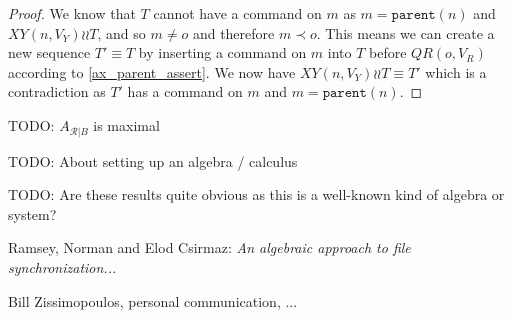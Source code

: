 \documentclass[12pt]{article}
\newcommand{\parent}{\mathtt{parent}}
\newcommand{\fscommand}[2]{{#1#2}}
\newcommand{\cxy}{\fscommand{X}{Y}}
\newcommand{\cqr}{\fscommand{Q}{R}}
\newcommand{\descendant}{\prec}
\newcommand{\indep}{\mathrel{\wr\wr}} %
\newcommand{\recchar}[3]{{#1}^{#3}_{\mathcal{R}|{#2}}}
\newcommand{\reca}{\recchar{A}{B}{}} %
\theoremstyle{definition}
\begin{document}
\begin{proof}
We know that $T$ cannot have a command on $m$ as $m=\parent(n)$ and $\cxy(n,V_Y)\indep T$,
and so $m\neq o$ and therefore $m\descendant o$.
This means we can create a new sequence $T'\equiv T$ by inserting a command on 
$m$ into $T$ before $\cqr(o,V_R)$
according to \cref{ax_parent_assert}.
We now have $\cxy(n,V_Y)\indep T\equiv T'$ which is a contradiction as
$T'$ has a command on $m$ and $m=\parent(n)$.
\end{proof}

TODO: $\reca$ is maximal

TODO: About setting up an algebra / calculus

TODO: Are these results quite obvious as this is a well-known kind of algebra or system?

\begin{thebibliography}{99}

 Ramsey, Norman and Elod Csirmaz: {\it An algebraic approach to
file synchronization...}

 Bill Zissimopoulos, personal communication, ...

\end{thebibliography}
\end{document}
